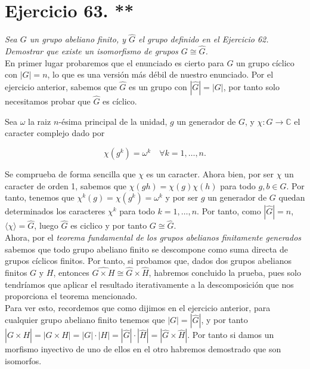 \section{Ejercicio 63. **}%
\label{sec:ejercicio_63_}

\textit{Sea \(G\) un grupo abeliano finito, y \(\hat{G}\) el grupo definido en el Ejercicio 62. Demostrar que existe un isomorfismo de grupos \(G \cong \hat{G}\).}\\

En primer lugar probaremos que el enunciado es cierto para \(G\) un grupo cíclico con \(|G| = n\), lo que es una versión más débil de nuestro enunciado. Por el ejercicio anterior, sabemos que \( \hat{G}\) es un grupo con \(|\hat{G}| = |G|\), por tanto solo necesitamos probar que \(\hat{G}\) es cíclico.

Sea \(\omega\) la raiz \(n\)-ésima principal de la unidad, \(g\) un generador de \(G\), y \(\chi:G \to \mathbb{C}\) el caracter complejo dado por

\[
\chi(g^k) = \omega^k \quad \forall k = 1, \ldots, n
.\]

Se comprueba de forma sencilla que \(\chi\) es un caracter. Ahora bien, por ser \(\chi\) un caracter de orden 1, sabemos que \(\chi(gh) = \chi(g)\chi(h)\) para todo  \(g, b \in G\). Por tanto, tenemos que \(\chi^k(g) = \chi(g^k) = \omega^k\) y por ser \(g\) un generador de \(G\) quedan determinados los caracteres  \(\chi^k\) para todo  \(k = 1, \ldots, n\). Por tanto, como \(|\widehat{G}| = n\), \(\langle\chi\rangle = \widehat{G}\), luego \( \widehat{G}\) es ciclico y por tanto \(G \cong \widehat{G}\).\\

Ahora, por el \textit{teorema fundamental de los grupos abelianos finitamente generados} sabemos que todo grupo abeliano finito se descompone como suma directa de grupos cíclicos finitos. Por tanto, si probamos que, dados dos grupos abelianos finitos \(G\) y \(H\), entonces  \( \widehat{G \times H} \cong \widehat{G} \times \widehat{H}\), habremos concluido la prueba, pues solo tendríamos que aplicar el resultado iterativamente a la descomposición que nos proporciona el teorema mencionado. \\

Para ver esto, recordemos que como dijimos en el ejercicio anterior, para cualquier grupo abeliano finito tenemos que \(|G| = |\widehat{G}|\), y por tanto \(|\widehat{G \times H}| = |G \times H| = |G| \cdot |H| = |\widehat{G}| \cdot |\widehat{H}| = |\widehat{G} \times \widehat{H}|\). Por tanto si damos un morfismo inyectivo de uno de ellos en el otro habremos demostrado que son isomorfos. \\

